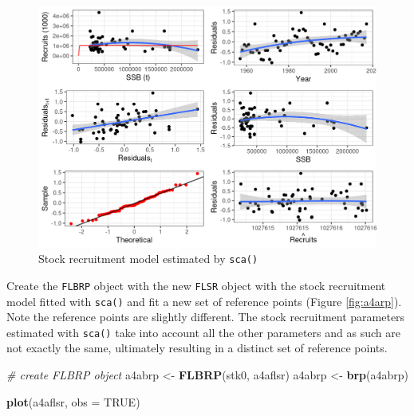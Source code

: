 \documentclass[
]{book}
\newenvironment{Shaded}{\begin{snugshade}}{\end{snugshade}}
\newcommand{\AttributeTok}[1]{\textcolor[rgb]{0.13,0.29,0.53}{#1}}
\newcommand{\CommentTok}[1]{\textcolor[rgb]{0.56,0.35,0.01}{\textit{#1}}}
\newcommand{\ConstantTok}[1]{\textcolor[rgb]{0.56,0.35,0.01}{#1}}
\newcommand{\FunctionTok}[1]{\textcolor[rgb]{0.13,0.29,0.53}{\textbf{#1}}}
\newcommand{\NormalTok}[1]{#1}
\newcommand{\OtherTok}[1]{\textcolor[rgb]{0.56,0.35,0.01}{#1}}
\begin{document}
\begin{figure}
\centering
\includegraphics{_bookdown_files/_main_files/figure-html/a4asr-1.png}
\caption{\label{fig:a4asr}Stock recruitment model estimated by \texttt{sca()}}
\end{figure}

Create the \texttt{FLBRP} object with the new \texttt{FLSR} object with the stock recruitment model fitted with \texttt{sca()} and fit a new set of reference points (Figure \ref{fig:a4arp}). Note the reference points are slightly different. The stock recruitment parameters estimated with \texttt{sca()} take into account all the other parameters and as such are not exactly the same, ultimately resulting in a distinct set of reference points.

\begin{Shaded}
\begin{Highlighting}[]
\CommentTok{\# create FLBRP object}
\NormalTok{a4abrp }\OtherTok{\textless{}{-}} \FunctionTok{FLBRP}\NormalTok{(stk0, a4aflsr)}
\NormalTok{a4abrp }\OtherTok{\textless{}{-}} \FunctionTok{brp}\NormalTok{(a4abrp)}
\end{Highlighting}
\end{Shaded}

\begin{Shaded}
\begin{Highlighting}[]
\FunctionTok{plot}\NormalTok{(a4aflsr, }\AttributeTok{obs =} \ConstantTok{TRUE}\NormalTok{)}
\end{Highlighting}
\end{Shaded}
\end{document}
